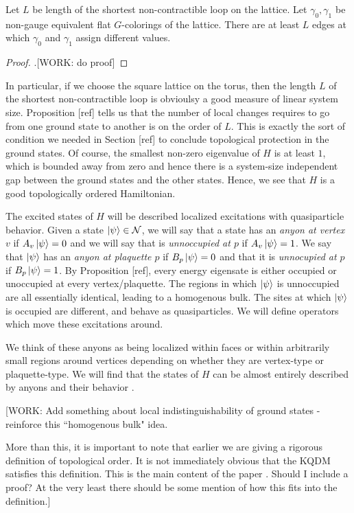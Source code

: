 \begin{proposition} Let $L$ be length of the shortest non-contractible loop on the lattice. Let $\gamma_0,\gamma_1$ be non-gauge equivalent flat $G$-colorings of the lattice. There are at least $L$ edges at which $\gamma_0$ and $\gamma_1$ assign different values.
\end{proposition} 
\begin{proof}.[WORK: do proof]
\end{proof}

In particular, if we choose the square lattice on the torus, then the length $L$ of the shortest non-contractible loop is obvioulsy a good measure of linear system size. Proposition [ref] tells us that the number of local changes requires to go from one ground state to another is on the order of $L$. This is exactly the sort of condition we needed in Section [ref] to conclude topological protection in the ground states. Of course, the smallest non-zero eigenvalue of $H$ is at least $1$, which is bounded away from zero and hence there is a system-size independent gap between the ground states and the other states. Hence, we see that $H$ is a good topologically ordered Hamiltonian. 

The excited states of $H$ will be described localized excitations with quasiparticle behavior. Given a state $\ket{\psi}\in \mathcal{N}$, we will say that a state has an \textit{anyon at vertex $v$} if $A_v\ket{\psi}=0$ and we will say that is \textit{unnoccupied at $p$} if $A_v\ket{\psi}=1$. We say that $\ket{\psi}$ has an \textit{anyon at plaquette $p$} if $B_p\ket{\psi}=0$ and that it is \textit{unnocupied at $p$} if $B_p\ket{\psi}=1$. By Proposition [ref], every energy eigensate is either occupied or unoccupied at every vertex/plaquette. The regions in which $\ket{\psi}$ is unnoccupied are all essentially identical, leading to a homogenous bulk. The sites at which $\ket{\psi}$ is occupied are different, and behave as quasiparticles. We will define operators which move these excitations around.

We think of these anyons as being localized within faces or within arbitrarily small regions around vertices depending on whether they are vertex-type or plaquette-type. We will find that the states of $H$ can be almost entirely described by anyons and their behavior .

[WORK: Add something about local indistinguishability of ground states - reinforce this ``homogenous bulk" idea.

More than this, it is important to note that earlier we are giving a rigorous definition of topological order. It is not immediately obvious that the KQDM satisfies this definition. This is the main content of the paper \cite{cui2020kitaev}. Should I include a proof? At the very least there should be some mention of how this fits into the definition.]

